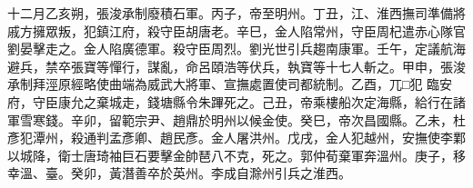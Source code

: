 \begin{pinyinscope}
 十二月乙亥朔，張浚承制廢積石軍。丙子，帝至明州。丁丑，江、淮西撫司準備將戚方擁眾叛，犯鎮江府，殺守臣胡唐老。辛巳，金人陷常州，守臣周杞遣赤心隊官劉晏擊走之。金人陷廣德軍。殺守臣周烈。劉光世引兵趨南康軍。壬午，定議航海避兵，禁卒張寶等憚行，謀亂，命呂頤浩等伏兵，執寶等十七人斬之。甲申，張浚承制拜涇原經略使曲端為威武大將軍、宣撫處置使司都統制。乙酉，兀□犯
 臨安府，守臣康允之棄城走，錢塘縣令朱蹕死之。己丑，帝乘樓船次定海縣，給行在諸軍雪寒錢。辛卯，留範宗尹、趙鼎於明州以候金使。癸巳，帝次昌國縣。乙未，杜彥犯潭州，殺通判孟彥卿、趙民彥。金人屠洪州。戊戌，金人犯越州，安撫使李鄴以城降，衛士唐琦袖巨石要擊金帥琶八不克，死之。郭仲荀棄軍奔溫州。庚子，移幸溫、臺。癸卯，黃潛善卒於英州。李成自滁州引兵之淮西。



\end{pinyinscope}